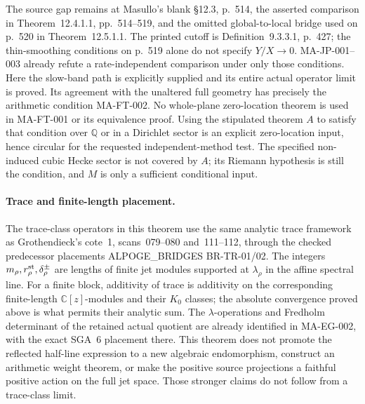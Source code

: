 The source gap remains at Masullo's blank \S12.3,
p.~514, the asserted comparison in Theorem~12.4.1.1,
pp.~514--519, and the omitted global-to-local bridge
used on p.~520 in Theorem~12.5.1.1.  The printed cutoff
is Definition~9.3.3.1, p.~427; the thin-smoothing
conditions on p.~519 alone do not specify $Y/X\to0$.
MA-JP-001--003 already refute a rate-independent
comparison under only those conditions.  Here the
slow-band path is explicitly supplied and its entire
actual operator limit is proved.  Its agreement with
the unaltered full geometry has precisely the arithmetic
condition MA-FT-002.  No whole-plane zero-location
theorem is used in MA-FT-001 or its equivalence proof.
Using the stipulated theorem $A$ to satisfy that
condition over $\mathbb Q$ or in a Dirichlet sector is
an explicit zero-location input, hence circular for
the requested independent-method test.  The specified
non-induced cubic Hecke sector is not covered by $A$;
its Riemann hypothesis is still the condition, and
$M$ is only a sufficient conditional input.

\paragraph{Trace and finite-length placement.}
The trace-class operators in this theorem use the
same analytic trace framework as Grothendieck's
cote~1, scans~079--080 and~111--112, through the checked
predecessor placements ALPOGE\_BRIDGES BR-TR-01/02.
The integers $m_\rho,r_\rho^{\rm st},\delta_\rho^\pm$
are lengths of finite jet modules supported at
$\lambda_\rho$ in the affine spectral line.
For a finite block, additivity of trace is additivity
on the corresponding finite-length
$\mathbb C[z]$-modules and their $K_0$ classes;
the absolute convergence proved above is what permits
their analytic sum.  The $\lambda$-operations and
Fredholm determinant of the retained actual quotient
are already identified in MA-EG-002, with the exact
SGA~6 placement there.  This theorem does not promote
the reflected half-line expression to a new algebraic
endomorphism, construct an arithmetic weight theorem,
or make the positive source projections a faithful
positive action on the full jet space.  Those stronger
claims do not follow from a trace-class limit.
